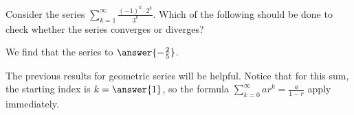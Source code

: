 \documentclass{ximera}
\author{Jim Talamo}
\begin{document}
\begin{exercise}
Consider the series $\sum_{k=1}^{\infty} \frac{(-1)^k \cdot 2^k}{3^k}$.  Which of the following should be done to check whether the series converges or diverges?
\begin{multipleChoice}
\end{multipleChoice}

\begin{exercise}
We find that the series  to $\answer{-\frac{2}{5}}$.

\begin{hint}
The previous results for geometric series will be helpful.  Notice that for this sum, the starting index is $k=\answer{1}$, so the formula $\sum_{k=0}^{\infty} ar^k = \frac{a}{1-r}$  apply immediately.
\end{hint}
\end{exercise}
\end{exercise}
\end{document}
